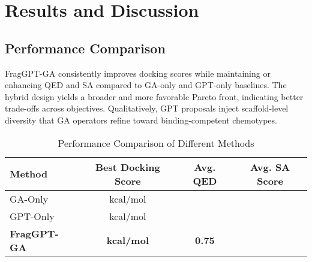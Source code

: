 \documentclass[lettersize,journal]{IEEEtran}
\begin{document}
\section{Results and Discussion}
\subsection{Performance Comparison}
FragGPT-GA consistently improves docking scores while maintaining or enhancing QED and SA compared to GA-only and GPT-only baselines. The hybrid design yields a broader and more favorable Pareto front, indicating better trade-offs across objectives. Qualitatively, GPT proposals inject scaffold-level diversity that GA operators refine toward binding-competent chemotypes.
\begin{table}[!t]
\caption{Performance Comparison of Different Methods\label{tab:performance}}
\centering
\begin{tabular}{|l|c|c|c|}
\hline
\textbf{Method} & \textbf{Best Docking Score} & \textbf{Avg. QED} & \textbf{Avg. SA Score} \\
\hline
GA-Only &  kcal/mol &  & \\
GPT-Only &  kcal/mol &  &  \\
\textbf{FragGPT-GA} & \textbf{  kcal/mol} & \textbf{0.75} & \textbf{} \\
\hline
\end{tabular}
\end{table}
\end{document}
